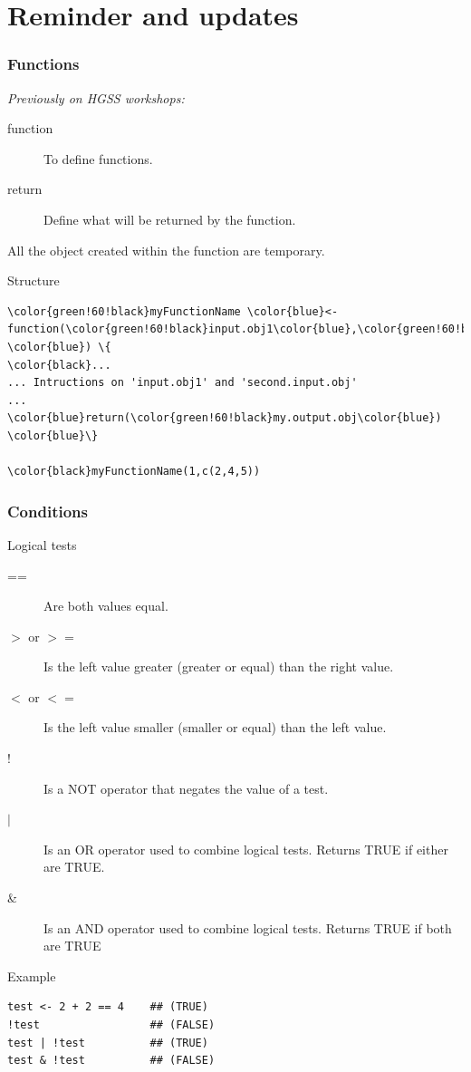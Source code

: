\documentclass[10pt]{beamer}
\newenvironment{xframe}[2][]
  {\begin{frame}[fragile,environment=xframe,#1]
  \frametitle{#2}}
  {\end{frame}}
\begin{document}



\section{Reminder and updates}

\begin{xframe}{Functions}
  {\it\small Previously on HGSS workshops: }
  \begin{block}{}
    \begin{description}
      \item[function] To define functions.
      \item[return] Define what will be returned by the function. 
    \end{description}
    All the object created within the function are temporary.
    \bigskip
    \end{block}
    \begin{block}{Structure}    
\begin{Verbatim}[commandchars=\\\{\}]
\color{green!60!black}myFunctionName \color{blue}<- function(\color{green!60!black}input.obj1\color{blue},\color{green!60!black}second.input.obj \color{blue}) \{
\color{black}...
... Intructions on 'input.obj1' and 'second.input.obj'
...
\color{blue}return(\color{green!60!black}my.output.obj\color{blue})
\color{blue}\}

\color{black}myFunctionName(1,c(2,4,5))
\end{Verbatim}
  \end{block}
\end{xframe}

\begin{xframe}{Conditions}
  \begin{block}{Logical tests}
	
    \begin{description}
    \item[{\sf ==}] Are both values equal.
    \item[{\sf $>$ or $>=$}] Is the left value greater (greater or equal)
    than the right value.
	\item[{\sf $<$ or $<=$}] Is the left value smaller (smaller or equal) than
	the left value.
    \item[!] Is a NOT operator that negates the value of a test.
    \item[$|$] Is an OR operator used to combine logical tests. Returns TRUE if
    either are TRUE.
    \item[\&] Is an AND operator used to combine logical tests. Returns TRUE
    if both are TRUE
    \end{description}
  \end{block}
  \begin{exampleblock}{Example}
\begin{verbatim}
test <- 2 + 2 == 4    ## (TRUE)
!test                 ## (FALSE)
test | !test          ## (TRUE)
test & !test          ## (FALSE)
\end{verbatim}  
  \end{exampleblock}
\end{xframe}
\end{document}
